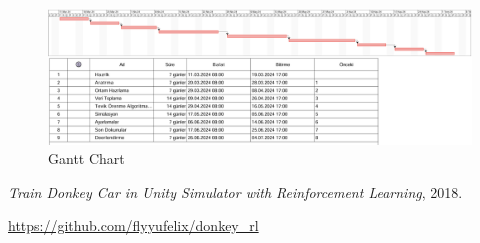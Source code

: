\documentclass{article}
\begin{document}
\newpage

\begin{landscape}
\thispagestyle{empty}
    \begin{figure}
     \centering
  \includegraphics[width=1.8\textwidth]{gantchart.png}\centering %
  \caption{Gantt Chart}
  \label{fig:resim_etiketi}
\end{figure}

\end{landscape}



\newpage




\textit{Train Donkey Car in Unity Simulator with Reinforcement Learning}, 2018.
\par
\url{https://github.com/flyyufelix/donkey_rl}
\end{document}

